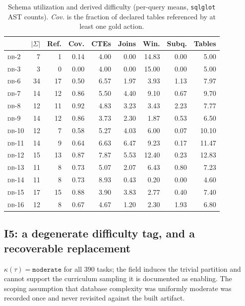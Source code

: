 \documentclass[11pt,letterpaper]{article}
\theoremstyle{definition}
\theoremstyle{plain}
\theoremstyle{remark}
\newcommand{\dbn}[1]{\textsc{db-#1}}
\newcommand{\code}[1]{\texttt{#1}}
\begin{document}
\begin{table}[t]
\centering\small
\caption{Schema utilization and derived difficulty (per-query means, \texttt{sqlglot} AST
counts). \emph{Cov.} is the fraction of declared tables referenced by at least one gold action.}
\label{tab:coverage}
\begin{tabular}{@{}lrrr@{\hspace{1.5em}}rrrrr@{}}
\toprule
& $|\Sigma|$ & \textbf{Ref.} & \textbf{Cov.} & \textbf{CTEs} & \textbf{Joins} & \textbf{Win.} & \textbf{Subq.} & \textbf{Tables} \\
\midrule
\dbn{2}  &  7 &  1 & 0.14 & 4.00 & 0.00 & 14.83 & 0.00 &  5.00 \\
\dbn{3}  &  3 &  0 & 0.00 & 4.00 & 0.00 & 15.00 & 0.00 &  5.00 \\
\dbn{6}  & 34 & 17 & 0.50 & 6.57 & 1.97 &  3.93 & 1.13 &  7.97 \\
\dbn{7}  & 14 & 12 & 0.86 & 5.50 & 4.40 &  9.10 & 0.67 &  9.70 \\
\dbn{8}  & 12 & 11 & 0.92 & 4.83 & 3.23 &  3.43 & 2.23 &  7.77 \\
\dbn{9}  & 14 & 12 & 0.86 & 3.73 & 2.30 &  1.87 & 0.53 &  6.50 \\
\dbn{10} & 12 &  7 & 0.58 & 5.27 & 4.03 &  6.00 & 0.07 & 10.10 \\
\dbn{11} & 14 &  9 & 0.64 & 6.63 & 6.47 &  9.23 & 0.17 & 11.47 \\
\dbn{12} & 15 & 13 & 0.87 & 7.87 & 5.53 & 12.40 & 0.23 & 12.83 \\
\dbn{13} & 11 &  8 & 0.73 & 5.07 & 2.07 &  6.43 & 0.80 &  7.23 \\
\dbn{14} & 11 &  8 & 0.73 & 8.93 & 0.43 &  0.20 & 0.00 &  4.60 \\
\dbn{15} & 17 & 15 & 0.88 & 3.90 & 3.83 &  2.77 & 0.40 &  7.40 \\
\dbn{16} & 12 &  8 & 0.67 & 4.67 & 1.20 &  2.30 & 1.93 &  6.80 \\
\bottomrule
\end{tabular}
\end{table}

\subsection{I5: a degenerate difficulty tag, and a recoverable replacement}
\label{sec:i5}

$\kappa(\tau) = \code{moderate}$ for all $390$ tasks; the field induces the trivial partition
and cannot support the curriculum sampling it is documented as enabling. The scoping
assumption that database complexity was uniformly moderate was recorded once and never
revisited against the built artifact.
\end{document}
